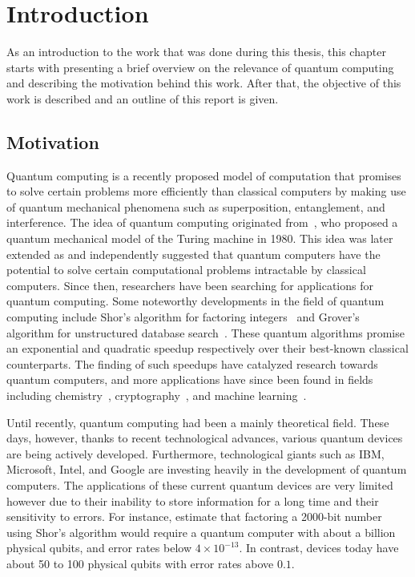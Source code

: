 \chapter{Introduction}
As an introduction to the work that was done during this thesis, this chapter starts with presenting a brief overview on the relevance of quantum computing and describing the motivation behind this work.
After that, the objective of this work is described and an outline of this report is given.

\section{Motivation}
Quantum computing is a recently proposed model of computation that promises to solve certain problems more efficiently than classical computers by making use of quantum mechanical phenomena such as superposition, entanglement, and interference.
The idea of quantum computing originated from~\textcite{benioff1980computer}, who proposed a quantum mechanical model of the Turing machine in 1980.
This idea was later extended as \textcite{manin1980vychislimoe} and \textcite{feynman1982simulating} independently suggested that quantum computers have the potential to solve certain computational problems intractable by classical computers.
Since then, researchers have been searching for applications for quantum computing.
Some noteworthy developments in the field of quantum computing include Shor's algorithm for factoring integers~\cite{shor1999polynomial} and Grover's algorithm for unstructured database search~\cite{grover1996fast}.
These quantum algorithms promise an exponential and quadratic speedup respectively over their best-known classical counterparts.
The finding of such speedups have catalyzed research towards quantum computers, and more applications have since been found in fields including chemistry~\cite{mcardle2018quantum}, cryptography~\cite{bennett2014quantum}, and machine learning~\cite{biamonte2017quantum}.

Until recently, quantum computing had been a mainly theoretical field.
These days, however, thanks to recent technological advances, various quantum devices are being actively developed.
Furthermore, technological giants such as IBM, Microsoft, Intel, and Google are investing heavily in the development of quantum computers.
The applications of these current quantum devices are very limited however due to their inability to store information for a long time and their sensitivity to errors.
For instance, \textcite[Appendix~M]{fowler2012surface} estimate that factoring a 2000-bit number using Shor's algorithm would require a quantum computer with about a billion physical qubits, and error rates below $4 \times 10^{-13}$.
In contrast, devices today have about 50 to 100 physical qubits with error rates above $0.1$.

